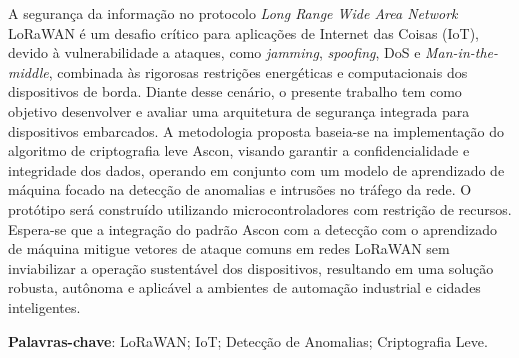 \documentclass[
	12pt,				%
	openright,			%
	twoside,			%
	a4paper,			%
	english,			%
	brazilian				%
	]{abntex2}
\begin{document}



\setlength{\absparsep}{18pt} %
\begin{resumo}
A segurança da informação no protocolo \textit{Long Range Wide Area Network} LoRaWAN é um desafio crítico para aplicações de Internet das Coisas (IoT), devido à vulnerabilidade a ataques, como \textit{jamming}, \textit{spoofing}, DoS e \textit{Man-in-the-middle}, combinada às rigorosas restrições energéticas e computacionais dos dispositivos de borda. Diante desse cenário, o presente trabalho tem como objetivo desenvolver e avaliar uma arquitetura de segurança integrada para dispositivos embarcados. A metodologia proposta baseia-se na implementação do algoritmo de criptografia leve Ascon, visando garantir a confidencialidade e integridade dos dados, operando em conjunto com um modelo de aprendizado de máquina focado na detecção de anomalias e intrusões no tráfego da rede. O protótipo será construído utilizando microcontroladores com restrição de recursos. Espera-se que a integração do padrão Ascon com a detecção com o aprendizado de máquina mitigue vetores de ataque comuns em redes LoRaWAN sem inviabilizar a operação sustentável dos dispositivos, resultando em uma solução robusta, autônoma e aplicável a ambientes de automação industrial e cidades inteligentes.

 \textbf{Palavras-chave}: LoRaWAN; IoT; Detecção de Anomalias; Criptografia Leve.
\end{resumo}
\end{document}
